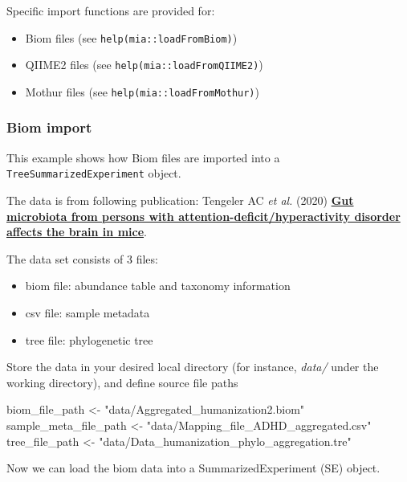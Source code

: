 \documentclass[
]{book}
\newenvironment{Shaded}{\begin{snugshade}}{\end{snugshade}}
\newcommand{\NormalTok}[1]{#1}
\newcommand{\OtherTok}[1]{\textcolor[rgb]{0.56,0.35,0.01}{#1}}
\newcommand{\StringTok}[1]{\textcolor[rgb]{0.31,0.60,0.02}{#1}}
\providecommand{\tightlist}{%
  \setlength{\itemsep}{0pt}\setlength{\parskip}{0pt}}
\begin{document}
Specific import functions are provided for:

\begin{itemize}
\tightlist
\item
  Biom files (see \texttt{help(mia::loadFromBiom)})
\item
  QIIME2 files (see \texttt{help(mia::loadFromQIIME2)})
\item
  Mothur files (see \texttt{help(mia::loadFromMothur)})
\end{itemize}

\hypertarget{biom-import}{%
\subsubsection{Biom import}\label{biom-import}}

This example shows how Biom files are imported into a
\texttt{TreeSummarizedExperiment} object.

The data is from following publication:
Tengeler AC \emph{et al.} (2020) \href{https://doi.org/10.1186/s40168-020-00816-x}{\textbf{Gut microbiota from persons with
attention-deficit/hyperactivity disorder affects the brain in
mice}}.

The data set consists of 3 files:

\begin{itemize}
\tightlist
\item
  biom file: abundance table and taxonomy information
\item
  csv file: sample metadata
\item
  tree file: phylogenetic tree
\end{itemize}

Store the data in your desired local directory (for instance, \emph{data/} under the
working directory), and define source file paths

\begin{Shaded}
\begin{Highlighting}[]
\NormalTok{biom\_file\_path }\OtherTok{\textless{}{-}} \StringTok{"data/Aggregated\_humanization2.biom"}
\NormalTok{sample\_meta\_file\_path }\OtherTok{\textless{}{-}} \StringTok{"data/Mapping\_file\_ADHD\_aggregated.csv"}
\NormalTok{tree\_file\_path }\OtherTok{\textless{}{-}} \StringTok{"data/Data\_humanization\_phylo\_aggregation.tre"}
\end{Highlighting}
\end{Shaded}

Now we can load the biom data into a SummarizedExperiment (SE) object.
\end{document}
